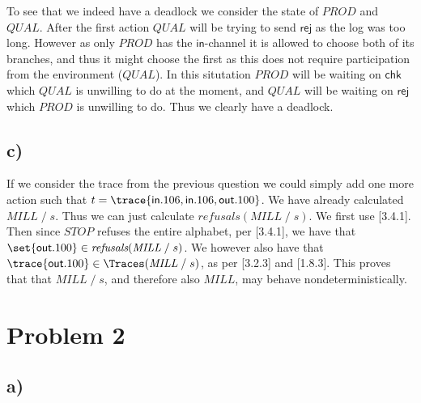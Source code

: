 \documentclass[a4paper, 11pt]{article}
\def\Prod{\textit{PROD}}
\def\Qual{\textit{QUAL}}
\def\Mill{\textit{MILL}}
\def\Stop{\textit{STOP}}
\def\inc{\textsf{in}}
\def\chk{\textsf{chk}}
\def\rej{\textsf{rej}}
\def\outc{\textsf{out}}
\newcommand{\law}[2]{[#1\;\text{#2}]}
\def\after{\;/\;}
\def\Refusals{\textit{refusals}}
\begin{document}
To see that we indeed have a deadlock we consider the state of $\Prod$ and $\Qual$. After the first action $\Qual$ will be trying to send $\rej$ as the log was too long. However as only $\Prod$ has the $\inc$-channel it is allowed to choose both of its branches, and thus it might choose the first as this does not require participation from the environment ($\Qual$). In this situtation $\Prod$ will be waiting on $\chk$ which $\Qual$ is unwilling to do at the moment, and $\Qual$ will be waiting on $\rej$ which $\Prod$ is unwilling to do. Thus we clearly have a deadlock.


\subsection{c)} %
If we consider the trace from the previous question we could simply add one more action such that $t = \trace{\inc . 106, \inc . 106, \outc . 100}$. We have already calculated $\Mill \after s$. Thus we can just calculate $\Refusals(\Mill \after s)$. We first use \law{3.4.1}{L4}. Then since $\Stop$ refuses the entire alphabet, per \law{3.4.1}{L1}, we have that $\set{\outc . 100} \in \Refusals(\Mill \after s)$. We however also have that $\trace{\outc . 100} \in \Traces(\Mill \after s)$, as per \law{3.2.3}{L2} and \law{1.8.3}{L3A}. This proves that that $\Mill \after s$, and therefore also $\Mill$, may behave nondeterministically.


\section{Problem 2} %
\label{sec:problem_2}

\subsection{a)} %
\end{document}
